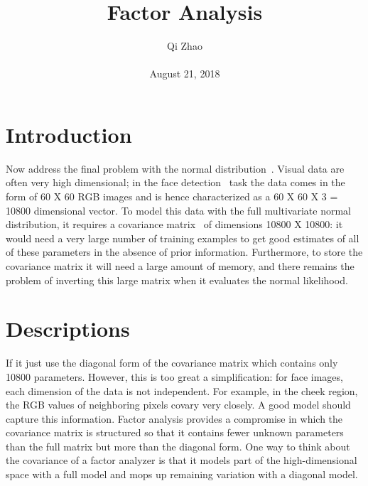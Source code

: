 \documentclass[10pt,twocolumn,letterpaper]{article}
\begin{document}
\title{Factor Analysis}
\author{Qi Zhao\\\\August 21, 2018}

\maketitle
\section{Introduction}
 Now address the final problem with the normal distribution~\cite{Azzalini2010Statistical}. Visual data are often very high dimensional; in the face detection~\cite{Osuna2002Training} task the data comes in the form of 60 X 60 RGB images and is hence characterized as a 60 X 60 X 3 = 10800 dimensional vector. To model this data with the full multivariate normal distribution, it requires a covariance matrix~\cite{Ahmad2016On} of dimensions 10800 X 10800: it would need a very large number of training examples to get good estimates of all of these parameters in the absence of prior information. Furthermore, to store the covariance matrix it will need a large amount of memory, and there remains the problem of inverting this large matrix when it evaluates the normal likelihood.



\section{Descriptions}
If it just use the diagonal form of the covariance matrix which contains only 10800 parameters. However, this is too great a simplification: for face images, each dimension of the data is  not independent. For example, in the cheek region, the RGB values of neighboring  pixels covary very closely. A good model should capture this information. Factor analysis provides a compromise in which the covariance matrix is structured so that it contains fewer unknown parameters than the full matrix but more than the diagonal form. One way to think about the covariance of a factor analyzer is that it models part of the high-dimensional space with a full model and mops up remaining variation with a diagonal model.
\end{document}
